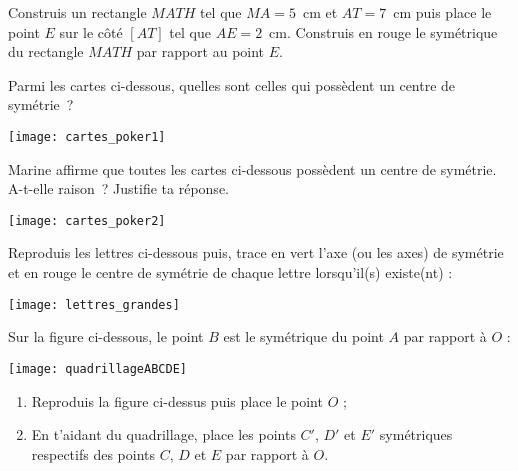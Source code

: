 \begin{exercice}
Construis un rectangle $MATH$ tel que $MA = 5$ cm et $AT = 7$ cm puis place le point $E$ sur le côté $[AT]$ tel que $AE = 2$ cm. Construis en rouge le symétrique du rectangle $MATH$ par rapport au point $E$.
\end{exercice}


\begin{exercice}
Parmi les cartes ci-dessous, quelles sont celles qui possèdent un centre de symétrie ? 
 \begin{center} \texttt{[image: cartes\_poker1]} \end{center}
\end{exercice}

\newpage

\begin{exercice}
Marine affirme que toutes les cartes ci-dessous possèdent un centre de symétrie. A-t-elle raison ? Justifie ta réponse.
 \begin{center} \texttt{[image: cartes\_poker2]} \end{center}
\end{exercice}


\begin{exercice}
Reproduis les lettres ci-dessous puis, trace en vert l'axe (ou les axes) de symétrie et en rouge le centre de symétrie de chaque lettre lorsqu'il(s) existe(nt) :
 \begin{center} \texttt{[image: lettres\_grandes]} \end{center}
\end{exercice}


\begin{exercice}
Sur la figure ci-dessous, le point $B$ est le symétrique du point $A$ par rapport à $O$ :
 \begin{center} \texttt{[image: quadrillageABCDE]} \end{center}
\begin{enumerate}
 \item Reproduis la figure ci-dessus puis place le point $O$ ;
 \item En t'aidant du quadrillage, place les points $C'$, $D'$ et $E'$ symétriques respectifs des points $C$, $D$ et $E$ par rapport à $O$.
 \end{enumerate}
\end{exercice}


